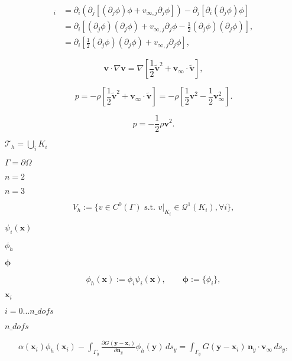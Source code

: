 \documentclass{article}
\begin{document}
\begin{align*} [\mathbf{v}\cdot\nabla\mathbf{v}]_i &= \partial_i (\partial_j [(\partial_j\phi) \phi + v_{\infty,j} \partial_j \phi]) - \partial_j [\partial_i (\partial_j\phi) \phi] \\ &= \partial_i \left[ (\partial_j\phi)(\partial_j \phi) + v_{\infty,j} \partial_j \phi - \frac 12 (\partial_j\phi)(\partial_j\phi) \right], \\ &= \partial_i \left[ \frac 12 (\partial_j\phi)(\partial_j \phi) + v_{\infty,j} \partial_j \phi \right], \end{align*}
\pagebreak

\[ \mathbf{v}\cdot\nabla\mathbf{v} = \nabla \left[ \frac 12 \mathbf{\tilde v}^2 + \mathbf{v}_{\infty} \cdot \mathbf{\tilde v} \right], \]
\pagebreak

\[ p = -\rho \left[ \frac 12 \mathbf{\tilde v}^2 + \mathbf{v}_{\infty} \cdot \mathbf{\tilde v} \right] = -\rho \left[ \frac 12 \mathbf{v}^2 - \frac 12 \mathbf{v}_{\infty}^2 \right] . \]
\pagebreak

\[ p = -\frac 12 \rho \mathbf{v}^2 . \]
\pagebreak

$\mathcal{T}_h = \bigcup_i K_i$
\pagebreak

$\Gamma = \partial \Omega$
\pagebreak

$n=2$
\pagebreak

$n=3$
\pagebreak

\[ \label{eq:definition-Vh} V_h := \{ v \in C^0(\Gamma) \text{ s.t. } v|_{K_i} \in \mathcal{Q}^1(K_i), \forall i\}, \]
\pagebreak

$\psi_i(\mathbf{x})$
\pagebreak

$\phi_h$
\pagebreak

$\boldsymbol{\phi}$
\pagebreak

\[ \label{eq:definition-of-element} \phi_h(\mathbf{x}) := \phi_i \psi_i(\mathbf{x}), \qquad \boldsymbol{\phi} := \{ \phi_i \}, \]
\pagebreak

$\mathbf x_i$
\pagebreak

$i=0...n\_dofs$
\pagebreak

$n\_dofs$
\pagebreak

\begin{align*} \alpha(\mathbf{x}_i) \phi_h(\mathbf{x}_i) - \int_{\Gamma_y} \frac{ \partial G(\mathbf{y}-\mathbf{x}_i)}{\partial\mathbf{n}_y } \phi_h(\mathbf{y}) \,ds_y = \int_{\Gamma_y} G(\mathbf{y}-\mathbf{x}_i) \, \mathbf{n}_y\cdot\mathbf{v_\infty} \,ds_y , \end{align*}
\pagebreak
\end{document}
